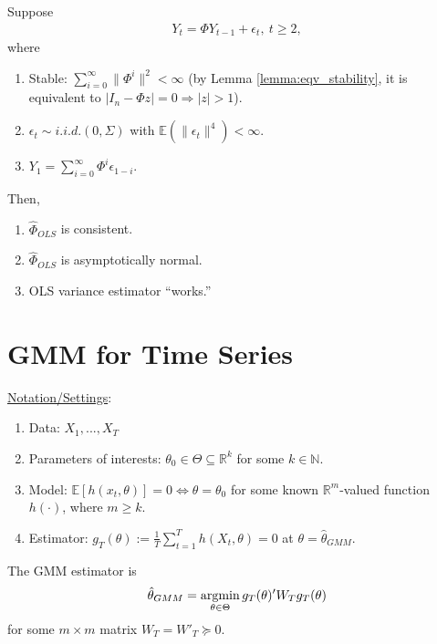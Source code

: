 \documentclass[11pt]{elegantbook}
\newcommand{\argmin}{\operatornamewithlimits{argmin}}
\begin{document}
\begin{proposition}
    Suppose
    \begin{equation}
        \begin{aligned}
            Y_t=\Phi Y_{t-1} + \epsilon_t, \ t\geq 2,
        \end{aligned}
        \nonumber
    \end{equation}
    where
    \begin{enumerate}
        \item Stable: $\sum_{i=0}^\infty\|\Phi^i\|^2<\infty$ (by Lemma \ref{lemma:eqv_stability}, it is equivalent to $|I_n-\Phi z|=0 \Rightarrow |z|>1$).
        \item $\epsilon_t\sim{i.i.d.}(0,\Sigma)$ with $\mathbb{E}(\|\epsilon_t\|^4)<\infty$.
        \item $Y_1=\sum_{i=0}^\infty \Phi^i\epsilon_{1-i}$.
    \end{enumerate}
    Then,
    \begin{enumerate}
        \item $\hat{\Phi}_{OLS}$ is consistent.
        \item $\hat{\Phi}_{OLS}$ is asymptotically normal.
        \item OLS variance estimator ``works.''
    \end{enumerate}
\end{proposition}

\section{GMM for Time Series}
\underline{Notation/Settings}:
\begin{enumerate}
    \item Data: $X_{1},...,X_T$
    \item Parameters of interests: $\theta_0\in \Theta\subseteq \mathbb{R}^k$ for some $k\in \mathbb{N}$.
    \item Model: $\mathbb{E}[h(x_t,\theta)]=0\Leftrightarrow \theta=\theta_0$ for some known $\mathbb{R}^m$-valued function $h(\cdot)$, where $m\geq k$.
    \item Estimator: $g_T(\theta):=\frac{1}{T}\sum_{t=1}^T h(X_t,\theta)=0$ at $\theta=\hat{\theta}_{GMM}$.
\end{enumerate}
\begin{definition}
    The GMM estimator is
    $$\hat{\theta}_{GMM}=\argmin_{\theta\in \Theta}g_T(\theta)'W_Tg_T(\theta)$$ for some $m\times m$ matrix $W_T=W'_T\succeq 0$.
\end{definition}
\end{document}
